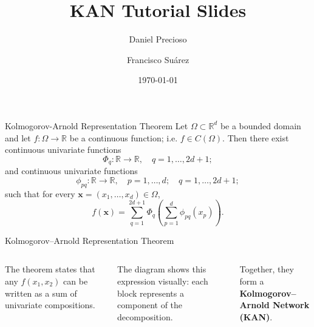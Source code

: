 \documentclass[aspectratio=169]{beamer}
\title[Kolmogorov–Arnold Networks]{KAN Tutorial Slides}
\author[Daniel Precioso \and Francisco Suárez]{Daniel Precioso \and Francisco Suárez}
\date{\today}
\begin{document}
\maketitle

\begin{frame}{Kolmogorov-Arnold Representation Theorem}
Let $ \Omega \subset \mathbb{R}^d $ be a bounded domain and let $ f: \Omega \rightarrow \mathbb{R} $ be a continuous function; i.e. $ f \in C(\Omega) $. Then there exist continuous univariate functions
$$
\Phi_q: \mathbb{R} \to \mathbb{R}, \quad q = 1, \dots, 2d+1;
$$
and continuous univariate functions
$$
\phi_{pq}: \mathbb{R} \to \mathbb{R}, \quad p = 1, \dots, d; \quad q = 1, \dots, 2d+1;
$$
such that for every $\mathbf{x} = (x_1, \dots, x_d) \in \Omega$,
$$
f(\mathbf{x}) = \sum_{q=1}^{2d+1} \Phi_q \left( \sum_{p=1}^d \phi_{pq}(x_p) \right).
$$
\end{frame}


\begin{frame}{Kolmogorov–Arnold Representation Theorem}
	
	\begin{columns}[T,onlytextwidth]
		
		\centering
		\resizebox{!}{0.75\textheight}{}
		
		The theorem states that any $f(x_1, x_2)$ can be written as a sum of univariate compositions.
		
		The diagram shows this expression visually: each block represents a component of the decomposition.
		
		Together, they form a \textbf{Kolmogorov–Arnold Network (KAN)}.
		
	\end{columns}
	
\end{frame}

\end{document}
